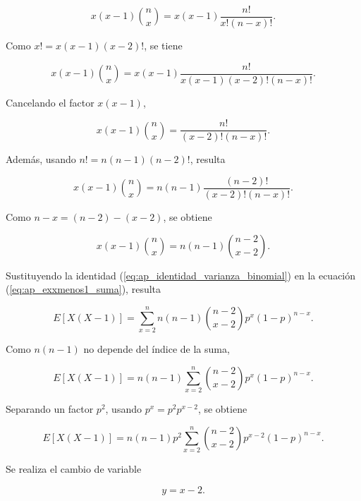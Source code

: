 \documentclass[12pt,a4paper]{article}
\begin{document}
\begin{equation}
    x(x-1)\binom{n}{x}
    =
    x(x-1)\frac{n!}{x!(n-x)!}.
\end{equation}

Como $x!=x(x-1)(x-2)!$, se tiene

\begin{equation}
    x(x-1)\binom{n}{x}
    =
    x(x-1)
    \frac{n!}{x(x-1)(x-2)!(n-x)!}.
\end{equation}

Cancelando el factor $x(x-1)$,

\begin{equation}
    x(x-1)\binom{n}{x}
    =
    \frac{n!}{(x-2)!(n-x)!}.
\end{equation}

Además, usando $n!=n(n-1)(n-2)!$, resulta

\begin{equation}
    x(x-1)\binom{n}{x}
    =
    n(n-1)
    \frac{(n-2)!}{(x-2)!(n-x)!}.
\end{equation}

Como $n-x=(n-2)-(x-2)$, se obtiene

\begin{equation}
    x(x-1)\binom{n}{x}
    =
    n(n-1)\binom{n-2}{x-2}.
\end{equation}

Sustituyendo la identidad (\ref{eq:ap_identidad_varianza_binomial}) en la ecuación (\ref{eq:ap_exxmenos1_suma}), resulta

\begin{equation}
    E[X(X-1)]
    =
    \sum_{x=2}^{n}
    n(n-1)\binom{n-2}{x-2}
    p^x(1-p)^{n-x}.
\end{equation}

Como $n(n-1)$ no depende del índice de la suma,

\begin{equation}
    E[X(X-1)]
    =
    n(n-1)
    \sum_{x=2}^{n}
    \binom{n-2}{x-2}
    p^x(1-p)^{n-x}.
\end{equation}

Separando un factor $p^2$, usando $p^x=p^2p^{x-2}$, se obtiene

\begin{equation}
    E[X(X-1)]
    =
    n(n-1)p^2
    \sum_{x=2}^{n}
    \binom{n-2}{x-2}
    p^{x-2}(1-p)^{n-x}.
\end{equation}

Se realiza el cambio de variable

\begin{equation}
    y=x-2.
\end{equation}
\end{document}
